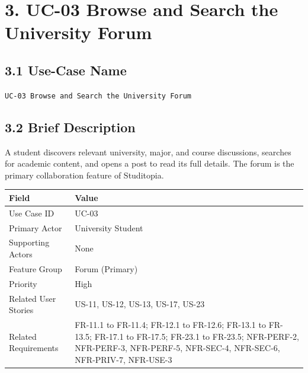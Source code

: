 \documentclass[12pt]{article}
\renewcommand{\baselinestretch}{1.5}
\begin{document}
\section*{3. UC-03 Browse and Search the University Forum}
\par\medskip
\hypertarget{sec:3-1-use-case-name}{}
\subsection*{3.1 Use-Case Name}
\par\medskip
\texttt{UC-03 Browse and Search the University Forum}
\par\medskip
\hypertarget{sec:3-2-brief-description}{}
\subsection*{3.2 Brief Description}
\par\medskip
A student discovers relevant university, major, and course discussions, searches for academic content, and opens a post to read its full details. The forum is the primary collaboration feature of Studitopia.
\par\medskip
\begingroup
\small
\renewcommand{\baselinestretch}{1.0}\selectfont
\renewcommand{\arraystretch}{1.15}
\setlength{\tabcolsep}{6pt}
\begin{longtable}{|>{\raggedright\arraybackslash}p{}|>{\raggedright\arraybackslash}p{}|}
\hline
\textbf{Field} & \textbf{Value} \\ \hline
\endhead
Use Case ID & UC-03 \\ \hline
Primary Actor & University Student \\ \hline
Supporting Actors & None \\ \hline
Feature Group & Forum (Primary) \\ \hline
Priority & High \\ \hline
Related User Stories & US-11, US-12, US-13, US-17, US-23 \\ \hline
Related Requirements & FR-11.1 to FR-11.4; FR-12.1 to FR-12.6; FR-13.1 to FR-13.5; FR-17.1 to FR-17.5; FR-23.1 to FR-23.5; NFR-PERF-2, NFR-PERF-3, NFR-PERF-5, NFR-SEC-4, NFR-SEC-6, NFR-PRIV-7, NFR-USE-3 \\ \hline
\end{longtable}
\endgroup
\par\medskip
\hypertarget{sec:3-3-use-case-diagram}{}
\end{document}
